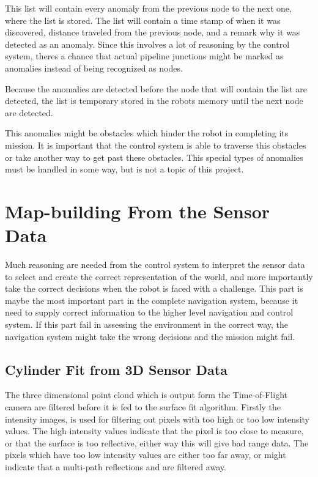 This list will contain every anomaly from the previous node to the next one, where the
list is stored. The list will contain a time stamp of when it was discovered, distance
traveled from the previous node, and a remark why it was detected as an anomaly. Since
this involves a lot of reasoning by the control system, theres a chance that actual
pipeline junctions might be marked as anomalies instead of being recognized as nodes.

Because the anomalies are detected before the node that will contain the list are
detected, the list is temporary stored in the robots memory until the next node are
detected. 

This anomalies might be obstacles which hinder the robot in completing its mission. It is
important that the control system is able to traverse this obstacles or take another way
to get past these obstacles. This special types of anomalies must be handled in some way,
but is not a topic of this project. 

\section{Map-building From the Sensor Data}
Much reasoning are needed from the control system to interpret the sensor data to select
and create the correct representation of the world, and more importantly take the correct
decisions when the robot is faced with a challenge. This part is maybe the most important
part in the complete navigation system, because it need to supply correct information to
the higher level navigation and control system. If this part fail in assessing the
environment in the correct way, the navigation system might take the wrong decisions and
the mission might fail. 

\subsection{Cylinder Fit from 3D Sensor Data}
The three dimensional point cloud which is output form the Time-of-Flight camera are
filtered before it is fed to the surface fit algorithm. Firstly the intensity images, is
used for filtering out pixels with too high or too low intensity values. The high
intensity values indicate that the pixel is too close to measure, or that the surface is
too reflective, either way this will give bad range data. The pixels which have too low
intensity values are either too far away, or might indicate that a multi-path reflections
and are filtered away. 

